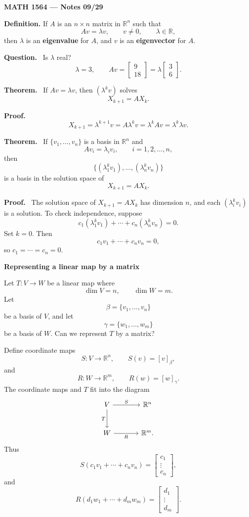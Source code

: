 \documentclass[letterpaper]{article}
\newcommand{\noteheader}[1]{\par\medskip\noindent\textbf{#1}\ }
\begin{document}
\textbf{MATH 1564 --- Notes 09/29}

\bigskip

\textbf{Definition.} If $A$ is an $n\times n$ matrix in $\mathbb{R}^n$ such that
\[
Av=\lambda v,
\qquad v\ne0,
\qquad \lambda\in\mathbb{R},
\]
then $\lambda$ is an \textbf{eigenvalue} for $A$, and $v$ is an \textbf{eigenvector} for $A$.

\medskip

\noteheader{Question.} Is $\lambda$ real?
\[
\lambda=3,
\qquad
Av=\begin{bmatrix}9\\18\end{bmatrix}
=\lambda\begin{bmatrix}3\\6\end{bmatrix}.
\]

\bigskip

\noteheader{Theorem.} If $Av=\lambda v$, then $(\lambda^k v)$ solves
\[
X_{k+1}=AX_k.
\]

\noteheader{Proof.}
\[
X_{k+1}=\lambda^{k+1}v=A\lambda^kv
=\lambda^kAv=\lambda^k\lambda v.
\]

\clearpage

\noteheader{Theorem.} If $\{v_1,\ldots,v_n\}$ is a basis in $\mathbb{R}^n$ and
\[
Av_i=\lambda_i v_i,
\qquad i=1,2,\ldots,n,
\]
then
\[
\{(\lambda_1^kv_1),\ldots,(\lambda_n^kv_n)\}
\]
is a basis in the solution space of
\[
X_{k+1}=AX_k.
\]

\noteheader{Proof.} The solution space of $X_{k+1}=AX_k$ has dimension $n$, and each $(\lambda_i^kv_i)$ is a solution. To check independence, suppose
\[
c_1(\lambda_1^kv_1)+\cdots+c_n(\lambda_n^kv_n)=0.
\]
Set $k=0$. Then
\[
c_1v_1+\cdots+c_nv_n=0,
\]
so $c_1=\cdots=c_n=0$.

\clearpage

\noteheader{Representing a linear map by a matrix}

\medskip

Let $T:V\to W$ be a linear map where
\[
\dim V=n,
\qquad
\dim W=m.
\]
Let
\[
\beta=\{v_1,\ldots,v_n\}
\]
be a basis of $V$, and let
\[
\gamma=\{w_1,\ldots,w_m\}
\]
be a basis of $W$. Can we represent $T$ by a matrix?

Define coordinate maps
\[
S:V\to\mathbb{R}^n,
\qquad S(v)=[v]_\beta,
\]
and
\[
R:W\to\mathbb{R}^m,
\qquad R(w)=[w]_\gamma.
\]
The coordinate maps and $T$ fit into the diagram
\[
\begin{tikzcd}[column sep=large,row sep=large]
V \arrow[r,"S"] \arrow[d,"T"'] & \mathbb{R}^n \\
W \arrow[r,"R"'] & \mathbb{R}^m .
\end{tikzcd}
\]
Thus
\[
S(c_1v_1+\cdots+c_nv_n)=\begin{bmatrix}c_1\\\vdots\\c_n\end{bmatrix},
\]
and
\[
R(d_1w_1+\cdots+d_mw_m)=\begin{bmatrix}d_1\\\vdots\\d_m\end{bmatrix}.
\]
\end{document}
